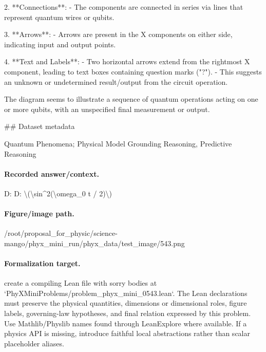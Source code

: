 2. **Connections**:
   - The components are connected in series via lines that represent quantum wires or qubits.

3. **Arrows**:
   - Arrows are present in the X components on either side, indicating input and output points.

4. **Text and Labels**:
   - Two horizontal arrows extend from the rightmost X component, leading to text boxes containing question marks ("?").
   - This suggests an unknown or undetermined result/output from the circuit operation.

The diagram seems to illustrate a sequence of quantum operations acting on one or more qubits, with an unspecified final measurement or output.

\#\# Dataset metadata

Quantum Phenomena; Physical Model Grounding Reasoning, Predictive Reasoning

\paragraph{Recorded answer/context.}
D: D: \textbackslash{}(\textbackslash{}sin\textasciicircum{}2(\textbackslash{}omega\_0 t / 2)\textbackslash{})

\paragraph{Figure/image path.}
/root/proposal\_for\_physic/science-mango/phyx\_mini\_run/phyx\_data/test\_image/543.png

\paragraph{Formalization target.}
create a compiling Lean file with sorry bodies at `PhyXMiniProblems/problem\_phyx\_mini\_0543.lean`. The Lean declarations must preserve the physical quantities, dimensions or dimensional roles, figure labels, governing-law hypotheses, and final relation expressed by this problem.
Use Mathlib/Physlib names found through LeanExplore where available. If a physics API is missing, introduce faithful local abstractions rather than scalar placeholder aliases.

